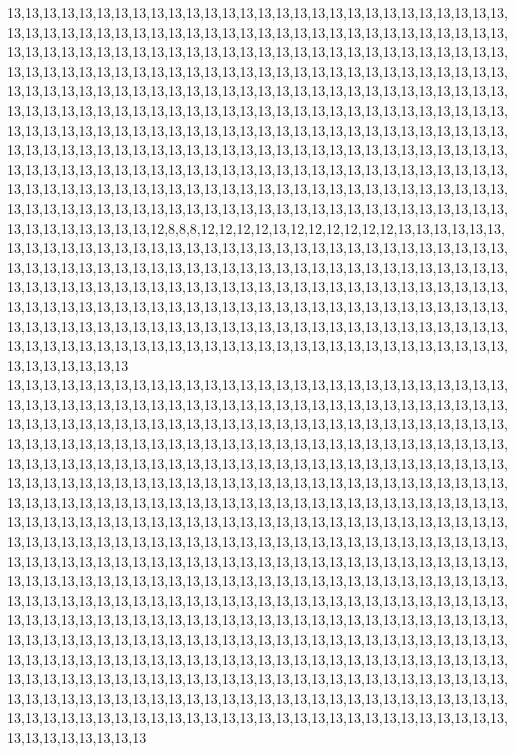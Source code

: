 13,13,13,13,13,13,13,13,13,13,13,13,13,13,13,13,13,13,13,13,13,13,13,13,13,13,13,13,13,13,13,13,13,13,13,13,13,13,13,13,13,13,13,13,13,13,13,13,13,13,13,13,13,13,13,13,13,13,13,13,13,13,13,13,13,13,13,13,13,13,13,13,13,13,13,13,13,13,13,13,13,13,13,13,13,13,13,13,13,13,13,13,13,13,13,13,13,13,13,13,13,13,13,13,13,13,13,13,13,13,13,13,13,13,13,13,13,13,13,13,13,13,13,13,13,13,13,13,13,13,13,13,13,13,13,13,13,13,13,13,13,13,13,13,13,13,13,13,13,13,13,13,13,13,13,13,13,13,13,13,13,13,13,13,13,13,13,13,13,13,13,13,13,13,13,13,13,13,13,13,13,13,13,13,13,13,13,13,13,13,13,13,13,13,13,13,13,13,13,13,13,13,13,13,13,13,13,13,13,13,13,13,13,13,13,13,13,13,13,13,13,13,13,13,13,13,13,13,13,13,13,13,13,13,13,13,13,13,13,13,13,13,13,13,13,13,13,13,13,13,13,13,13,13,13,13,13,13,13,13,13,13,13,13,13,13,13,13,13,13,13,13,13,13,13,13,13,13,13,13,13,13,13,13,13,13,13,13,13,13,13,13,13,13,13,13,13,13,13,13,13,13,13,13,13,13,13,13,13,13,13,13,13,13,13,13,12,8,8,8,12,12,12,12,13,12,12,12,12,12,12,13,13,13,13,13,13,13,13,13,13,13,13,13,13,13,13,13,13,13,13,13,13,13,13,13,13,13,13,13,13,13,13,13,13,13,13,13,13,13,13,13,13,13,13,13,13,13,13,13,13,13,13,13,13,13,13,13,13,13,13,13,13,13,13,13,13,13,13,13,13,13,13,13,13,13,13,13,13,13,13,13,13,13,13,13,13,13,13,13,13,13,13,13,13,13,13,13,13,13,13,13,13,13,13,13,13,13,13,13,13,13,13,13,13,13,13,13,13,13,13,13,13,13,13,13,13,13,13,13,13,13,13,13,13,13,13,13,13,13,13,13,13,13,13,13,13,13,13,13,13,13,13,13,13,13,13,13,13,13,13,13,13,13,13,13,13,13,13,13,13,13,13,13,13,13,13,13,13,13,13,13
13,13,13,13,13,13,13,13,13,13,13,13,13,13,13,13,13,13,13,13,13,13,13,13,13,13,13,13,13,13,13,13,13,13,13,13,13,13,13,13,13,13,13,13,13,13,13,13,13,13,13,13,13,13,13,13,13,13,13,13,13,13,13,13,13,13,13,13,13,13,13,13,13,13,13,13,13,13,13,13,13,13,13,13,13,13,13,13,13,13,13,13,13,13,13,13,13,13,13,13,13,13,13,13,13,13,13,13,13,13,13,13,13,13,13,13,13,13,13,13,13,13,13,13,13,13,13,13,13,13,13,13,13,13,13,13,13,13,13,13,13,13,13,13,13,13,13,13,13,13,13,13,13,13,13,13,13,13,13,13,13,13,13,13,13,13,13,13,13,13,13,13,13,13,13,13,13,13,13,13,13,13,13,13,13,13,13,13,13,13,13,13,13,13,13,13,13,13,13,13,13,13,13,13,13,13,13,13,13,13,13,13,13,13,13,13,13,13,13,13,13,13,13,13,13,13,13,13,13,13,13,13,13,13,13,13,13,13,13,13,13,13,13,13,13,13,13,13,13,13,13,13,13,13,13,13,13,13,13,13,13,13,13,13,13,13,13,13,13,13,13,13,13,13,13,13,13,13,13,13,13,13,13,13,13,13,13,13,13,13,13,13,13,13,13,13,13,13,13,13,13,13,13,13,13,13,13,13,13,13,13,13,13,13,13,13,13,13,13,13,13,13,13,13,13,13,13,13,13,13,13,13,13,13,13,13,13,13,13,13,13,13,13,13,13,13,13,13,13,13,13,13,13,13,13,13,13,13,13,13,13,13,13,13,13,13,13,13,13,13,13,13,13,13,13,13,13,13,13,13,13,13,13,13,13,13,13,13,13,13,13,13,13,13,13,13,13,13,13,13,13,13,13,13,13,13,13,13,13,13,13,13,13,13,13,13,13,13,13,13,13,13,13,13,13,13,13,13,13,13,13,13,13,13,13,13,13,13,13,13,13,13,13,13,13,13,13,13,13,13,13,13,13,13,13,13,13,13,13,13,13,13,13,13,13,13,13,13,13,13,13,13,13,13,13,13,13,13,13,13,13,13,13,13,13,13,13,13,13,13,13,13,13,13,13,13,13,13,13,13,13,13,13,13,13,13,13,13,13,13,13,13
